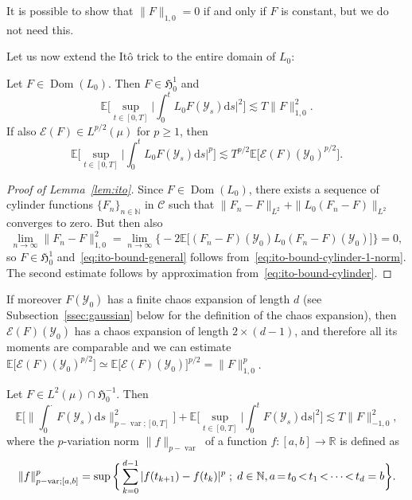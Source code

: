 \documentclass[AHL,Unicode,longabstracts]{cedram}
\DeclareMathOperator{\Dom}{Dom}
\DeclareMathOperator{\var}{var}
\newcommand{\bb}[1]{{\mathbb #1}}
\newcommand{\mc}[1]{{\mathcal #1}}
\renewcommand{\mc}[1]{{\mathcal #1}}
\newcommand*{\dd}{\mathrm{d}}
\newcommand*{\ds}{\dd s}
\newcommand*{\Mk}{\mkern -2mu}
\begin{document}
\begin{rema}
It is possible to show that $\| F\|_{1,0} = 0$ if and only if $F$ is constant, but we do not need this.
\end{rema}

Let us now extend the It\^o trick to the entire domain of $L_0$:
\begin{lemm}[It\^o trick] \label{lem:ito}
Let $F \in \Dom (L_0)$. Then $F \in \mathfrak{H}^1_0$
and
\begin{equation}\label{eq:ito-bound-general}
\mathbb{E} \bigg[\sup_{t \in [0,T]}
\bigg| \int_0^t L_0 F (\mc Y_s) \ds \bigg|^2 \bigg] \lesssim T \| F
\|_{1,0}^2.
\end{equation}
If also $\mathcal{E} (F) \in L^{p/2}(\mu)$ for $p\geqslant 1$, then
\begin{equation}\label{eq:ito-bound-general-p}
\mathbb{E} \bigg[\sup_{t \in [0,T]}
\bigg| \int_0^t L_0 F (\mc Y_s) \ds \bigg|^p \bigg] \lesssim T^{p / 2}
\mathbb{E} \big[\mathcal{E} (F) (\mc Y_0)^{p / 2}\big].
\end{equation}
\end{lemm}

\begin{proof}[Proof of Lemma~\ref{lem:ito}]
Since $F \in \Dom (L_0)$, there exists a sequence of cylinder functions $\{F_n\}_{n\in\mathbb N}$ in $\mc C$ such that $\| F_n - F \|_{L^2} + \| L_0 (F_n - F) \|_{L^2}$ converges to zero. But then also
\[
\lim_{n \rightarrow \infty} \| F_n - F \|_{1,0}^2 = \lim_{n \rightarrow
\infty} \Big\{ - 2\mathbb{E} \big[(F_n - F)(\mc Y_0) L_0 (F_n - F)(\mc Y_0)\big]\Big\} = 0,
\]
so $F \in \mathfrak{H}_0^1$ and~\eqref{eq:ito-bound-general} follows from~\eqref{eq:ito-bound-cylinder-1-norm}. The second estimate follows by approximation from~\eqref{eq:ito-bound-cylinder}.
\end{proof}

\begin{rema}\label{rmk:chaos-moments}
If moreover $F (\mc Y_0)$ has a finite chaos expansion of length $d$ (see Subsection~\ref{ssec:gaussian} below for the definition of the chaos expansion), then $\mathcal{E} (F) (\mc Y_0)$ has a chaos expansion of length $2 \times (d - 1)$, and therefore all its moments are comparable and we can estimate $\mathbb{E} \big[\mathcal{E} (F) (\mc Y_0)^{p / 2}\big] \simeq \mathbb{E}
\big[\mathcal{E} (F) (\mc Y_0)\big]^{p / 2} = \| F \|_{1,0}^p$.
\end{rema}

\begin{coro}\label{cor:KV}
Let $F \in L^2 (\mu) \cap \mathfrak{H}^{- 1}_0$. Then
\[
\mathbb{E} \bigg[\bigg\| \int_0^{\cdot} F (\mc Y_s) \ds \bigg\|_{p - \var ; [0, T]}^2 \bigg] +\mathbb{E} \bigg[\sup_{t \in [0,T]}
\bigg| \int_0^t F (\mc Y_s) \ds \bigg|^2 \bigg] \lesssim T \| F \|_{- 1,0}^2,
\]
where the $p$-variation norm $\|f\|_{p-\var}$ of a function $f:[a,b]\to \bb R$ is defined as
\begin{equation}\label{eq:pvar}
\!\|f \|_{p - \var ; [a, b]}^p = \sup\bigg\{ \sum_{k=0}^{d-1} |f(t_{k+1}) - f(t_k)|^p\; ; \; d \in \bb N, a \Mk=\Mk t_0 \Mk<\Mk t_1 \Mk< \Mk\cdots \Mk< \Mk t_d = b\bigg\}.\!
\end{equation}
\end{coro}
\end{document}
